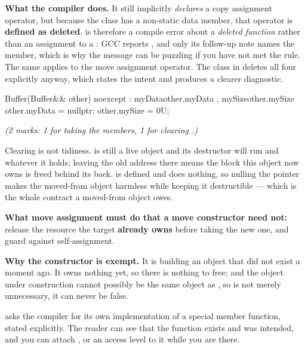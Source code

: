 \textbf{What the compiler does.} It still implicitly \emph{declares} a copy assignment operator, but
because the class has a  non-static data member, that operator is \textbf{defined as
deleted}.  is therefore a compile error about a \emph{deleted function} rather
than an assignment to a : GCC reports
, and only its follow-up note
names the  member, which is why the message can be puzzling if you have not met the
rule. The same applies to the move assignment operator. The class in  deletes all
four explicitly anyway, which states the intent and produces a clearer diagnostic. 

\begin{cppcode}
Buffer(Buffer&& other) noexcept
    : myData{other.myData}
    , mySize{other.mySize}
{
    other.myData = nullptr;
    other.mySize = 0U;
}
\end{cppcode}

{\itshape (2 marks: 1 for taking the members, 1 for clearing .)\par}

\medskip
Clearing  is not tidiness.  is still a live object and its
destructor will run and  whatever it holds; leaving the old address there means the
block this object now owns is freed behind its back.  is defined and does
nothing, so nulling the pointer makes the moved-from object harmless while keeping it destructible
--- which is the whole contract a moved-from object owes.

\textbf{What move assignment must do that a move constructor need not:} release the resource the
target \textbf{already owns} before taking the new one, and guard against self-assignment.

\textbf{Why the constructor is exempt.} It is building an object that did not exist a moment ago.
It owns nothing yet, so there is nothing to free; and the object under construction cannot possibly
be the same object as , so  is not merely unnecessary, it can
never be false. 

\textbf{} asks the compiler for its own implementation of a special member
function, stated explicitly. The reader can see that the function exists and was intended, and you
can attach ,  or an access level to it while you are there.

